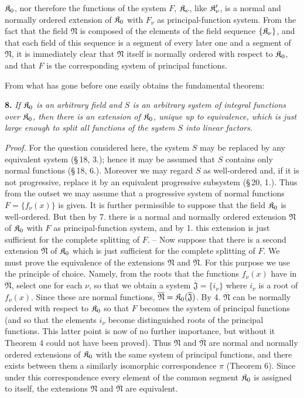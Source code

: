 $\mathfrak K_0$, nor therefore the functions of the system $F$, $\mathfrak K_\nu$, like $\mathfrak K_\nu'$, is a normal and normally ordered extension of $\mathfrak K_0$ with $F_\nu$ as principal-function system. From the fact that the field $\mathfrak N$ is composed of the elements of the field sequence $\{\mathfrak K_\nu\}$, and that each field of this sequence is a segment of every later one and a segment of $\mathfrak N$, it is immediately clear that $\mathfrak N$ itself is normally ordered with respect to $\mathfrak K_0$, and that $F$ is the corresponding system of principal functions.

From what has gone before one easily obtains the fundamental theorem:

\textbf{8.} \emph{If $\mathfrak K_0$ is an arbitrary field and $S$ is an arbitrary system of integral functions over $\mathfrak K_0$, then there is an extension of $\mathfrak K_0$, unique up to equivalence, which is just large enough to split all functions of the system $S$ into linear factors.}

\emph{Proof.} For the question considered here, the system $S$ may be replaced by any equivalent system (\S\,18, 3.); hence it may be assumed that $S$ contains only normal functions (\S\,18, 6.). Moreover we may regard $S$ as well-ordered and, if it is not progressive, replace it by an equivalent progressive subsystem (\S\,20, 1.). Thus from the outset we may assume that a progressive system of normal functions $F=\{f_\nu(x)\}$ is given. It is further permissible to suppose that the field $\mathfrak K_0$ is well-ordered. But then by 7. there is a normal and normally ordered extension $\mathfrak N$ of $\mathfrak K_0$ with $F$ as principal-function system, and by 1. this extension is just sufficient for the complete splitting of $F$. -- Now suppose that there is a second extension $\overline{\mathfrak N}$ of $\mathfrak K_0$ which is just sufficient for the complete splitting of $F$. We must prove the equivalence of the extensions $\mathfrak N$ and $\overline{\mathfrak N}$. For this purpose we use the principle of choice. Namely, from the roots that the functions $f_\nu(x)$ have in $\overline{\mathfrak N}$, select one for each $\nu$, so that we obtain a system $\overline{\mathfrak J}=\{i_\nu\}$ where $i_\nu$ is a root of $f_\nu(x)$. Since these are normal functions, $\overline{\mathfrak N}=\mathfrak K_0(\overline{\mathfrak J})$. By 4. $\overline{\mathfrak N}$ can be normally ordered with respect to $\mathfrak K_0$ so that $F$ becomes the system of principal functions (and so that the elements $i_\nu$ become distinguished roots of the principal functions. This latter point is now of no further importance, but without it Theorem 4 could not have been proved). Thus $\mathfrak N$ and $\overline{\mathfrak N}$ are normal and normally ordered extensions of $\mathfrak K_0$ with the same system of principal functions, and there exists between them a similarly isomorphic correspondence $\pi$ (Theorem 6). Since under this correspondence every element of the common segment $\mathfrak K_0$ is assigned to itself, the extensions $\mathfrak N$ and $\overline{\mathfrak N}$ are equivalent.

